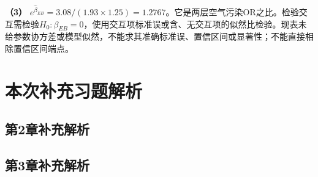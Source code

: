 \textbf{（3）} \(e^{\hat\beta_{EB}}=3.08/(1.93\times1.25)=1.2767\)。它是两层空气污染OR之比。检验交互需检验\(H_0:\beta_{EB}=0\)，使用交互项标准误或含、无交互项的似然比检验。现表未给参数协方差或模型似然，不能求其准确标准误、置信区间或显著性；不能直接相除置信区间端点。
\clearpage\section{本次补充习题解析}
\subsection*{第2章补充解析}

\subsection*{第3章补充解析}

\EndExercises
